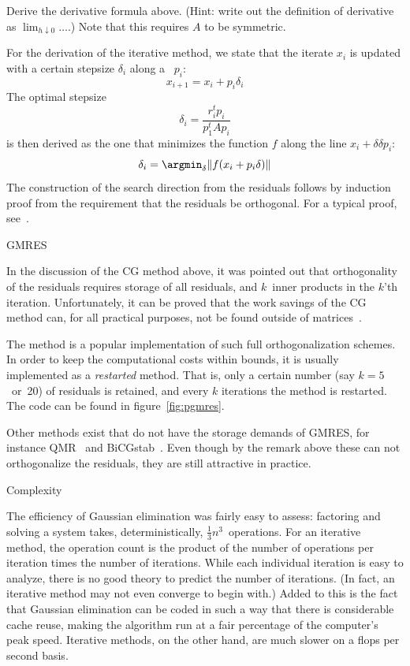 \begin{exercise}
  Derive the derivative formula above. (Hint: write out the definition
  of derivative as $\lim_{h\downarrow0}\ldots$.) Note that this
  requires $A$ to be symmetric.
\end{exercise}

For the derivation of the iterative method, we state that the iterate
$x_i$ is updated with a certain stepsize $\delta_i$ along a
~$p_i$:
\[ x_{i+1} = x_i+p_i\delta_i \]
The optimal stepsize
\[ \delta_i=\frac{r_i^tp_i}{p_1^tAp_i} \]
is then derived as the one that minimizes the function $f$ along the
line $x_i+\delta\delta p_i$:
\[ \delta_i = \argmin_\delta \| f(x_i+p_i\delta) \| \]
The construction of the search direction from the residuals follows by
induction proof from the requirement that the residuals be
orthogonal. For a typical proof, see~\cite{AxBa:febook}.

 {GMRES}
\label{sec:gmres}

In the discussion of the \ac{CG} method above, it was pointed out that
orthogonality of the residuals requires storage of all residuals, and
$k$~inner products in the $k$'th iteration. Unfortunately, it can be
proved that the work savings of the \ac{CG} method can, for all
practical purposes, not be found outside of 
matrices~\cite{FaberManteuffel:conditions-for-existence}.

The  method is a popular implementation of such full
orthogonalization schemes. In order to keep the computational costs
within bounds, it is usually implemented as a \emph{restarted}
method. That is, only a certain number (say $k=5$~or~20) of residuals
is retained, and every $k$ iterations the method is restarted. The
code can be found in figure~\ref{fig:pgmres}.



Other methods exist that do not have the storage demands of
\ac{GMRES}, for instance QMR~\cite{FrNa:qmr} and
BiCGstab~\cite{vdVorst1992:bicgstab}. Even though by the remark above
these can not orthogonalize the residuals, they are still attractive
in practice.

 {Complexity}

The efficiency of Gaussian elimination was fairly easy to assess:
factoring and solving a system takes, deterministically,
$\frac13n^3$~operations. For an iterative method, the operation count
is the product of the number of operations per iteration times the
number of iterations. While each individual iteration is easy to
analyze, there is no good theory to predict the number of
iterations. (In fact, an iterative method may not even converge to
begin with.) Added to this is the fact that Gaussian elimination can
be coded in such a way that there is considerable cache reuse, making
the algorithm run at a fair percentage of the computer's peak
speed. Iterative methods, on the other hand, are much slower on a
flops per second basis.

